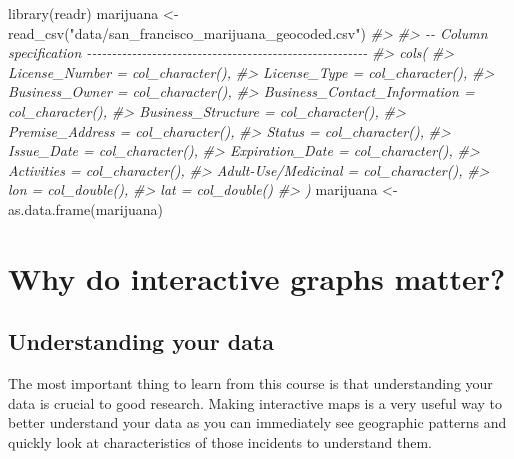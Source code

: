 \documentclass[
  12pt,
]{book}
\newenvironment{Shaded}{\begin{snugshade}}{\end{snugshade}}
\newcommand{\CommentTok}[1]{\textcolor[rgb]{0.37,0.37,0.37}{\textit{#1}}}
\newcommand{\FunctionTok}[1]{\textcolor[rgb]{0,0,0}{#1}}
\newcommand{\NormalTok}[1]{#1}
\newcommand{\OtherTok}[1]{\textcolor[rgb]{0.37,0.37,0.37}{#1}}
\newcommand{\StringTok}[1]{\textcolor[rgb]{0.5,0.5,0.5}{#1}}
\begin{document}
\begin{Shaded}
\begin{Highlighting}[]
\FunctionTok{library}\NormalTok{(readr)}
\NormalTok{marijuana }\OtherTok{\textless{}{-}} \FunctionTok{read\_csv}\NormalTok{(}\StringTok{"data/san\_francisco\_marijuana\_geocoded.csv"}\NormalTok{)}
\CommentTok{\#\textgreater{} }
\CommentTok{\#\textgreater{} {-}{-} Column specification {-}{-}{-}{-}{-}{-}{-}{-}{-}{-}{-}{-}{-}{-}{-}{-}{-}{-}{-}{-}{-}{-}{-}{-}{-}{-}{-}{-}{-}{-}{-}{-}{-}{-}{-}{-}{-}{-}{-}{-}{-}{-}{-}{-}{-}{-}{-}{-}{-}{-}{-}{-}{-}{-}{-}{-}}
\CommentTok{\#\textgreater{} cols(}
\CommentTok{\#\textgreater{}   License\_Number = col\_character(),}
\CommentTok{\#\textgreater{}   License\_Type = col\_character(),}
\CommentTok{\#\textgreater{}   Business\_Owner = col\_character(),}
\CommentTok{\#\textgreater{}   Business\_Contact\_Information = col\_character(),}
\CommentTok{\#\textgreater{}   Business\_Structure = col\_character(),}
\CommentTok{\#\textgreater{}   Premise\_Address = col\_character(),}
\CommentTok{\#\textgreater{}   Status = col\_character(),}
\CommentTok{\#\textgreater{}   Issue\_Date = col\_character(),}
\CommentTok{\#\textgreater{}   Expiration\_Date = col\_character(),}
\CommentTok{\#\textgreater{}   Activities = col\_character(),}
\CommentTok{\#\textgreater{}   \textasciigrave{}Adult{-}Use/Medicinal\textasciigrave{} = col\_character(),}
\CommentTok{\#\textgreater{}   lon = col\_double(),}
\CommentTok{\#\textgreater{}   lat = col\_double()}
\CommentTok{\#\textgreater{} )}
\NormalTok{marijuana }\OtherTok{\textless{}{-}} \FunctionTok{as.data.frame}\NormalTok{(marijuana)}
\end{Highlighting}
\end{Shaded}

\hypertarget{why-do-interactive-graphs-matter}{%
\section{Why do interactive graphs matter?}\label{why-do-interactive-graphs-matter}}

\hypertarget{understanding-your-data}{%
\subsection{Understanding your data}\label{understanding-your-data}}

The most important thing to learn from this course is that understanding your data is crucial to good research. Making interactive maps is a very useful way to better understand your data as you can immediately see geographic patterns and quickly look at characteristics of those incidents to understand them.
\end{document}
